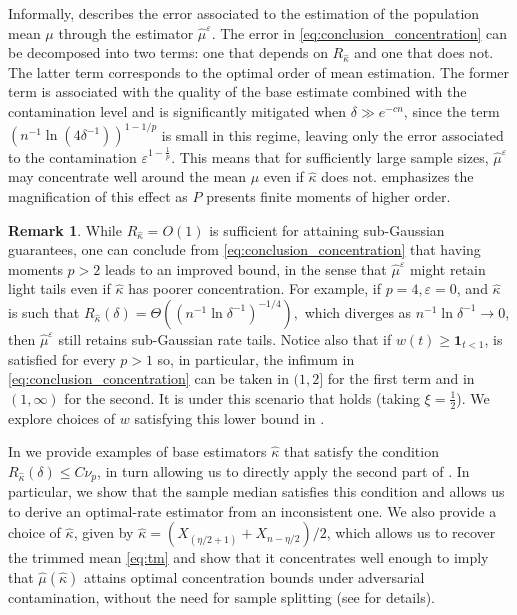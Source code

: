 \documentclass{article}
\theoremstyle{plain}
\theoremstyle{definition}
\newtheorem{remark}{Remark}
\begin{document}
Informally,  describes the error associated to the estimation of the population mean \( \mu \) through the estimator \( \widehat{\mu}^\varepsilon  \). The error in \eqref{eq:conclusion_concentration} can be decomposed into two terms: one that depends on $R_{\widehat{\kappa }} $ and one that does not. The latter term corresponds to the optimal order of mean estimation. The former term is associated with the quality of the base estimate combined with the contamination level and is significantly mitigated when \( \delta \gg e^{-cn}\), since the term \( \left(n^{-1}\ln (4\delta^{-1})\right)^{1-1/p}\) is small in this regime, leaving only the error associated to the contamination \( \varepsilon^{1-\frac{1}{p}} \). This means that for sufficiently large sample sizes, \( \widehat{\mu}^\varepsilon \) may concentrate well around the mean \( \mu \) even if \( \widehat{\kappa }   \) does not.  emphasizes the magnification of this effect as \( P \) presents finite moments of higher order.

\begin{remark}\label{remark:higher_moments} 
While \( R_{\widehat{\kappa } } = O(1) \) is sufficient for attaining sub-Gaussian guarantees, one can conclude from \eqref{eq:conclusion_concentration} that having moments $p>2$ leads to an improved bound, in the sense that $\widehat{\mu}^\varepsilon $ might retain light tails even if $\widehat{\kappa}$ has poorer concentration. For example, if \( p=4,\varepsilon=0 \), and \( \widehat{\kappa }  \) is such that $R_{\widehat{\kappa } }(\delta ) = \Theta((n^{-1}\ln \delta^{-1})^{-1/4}),$ which diverges as \( n^{-1} \ln \delta^{-1}  \to 0 \), then \( \widehat{\mu }^\varepsilon   \) still retains sub-Gaussian rate tails.
  Notice also that if $w(t) \geq \mathbf{1}_{t < 1}$,  is satisfied for every $p>1$ so, in particular, the infimum in \eqref{eq:conclusion_concentration} can be taken in \( (1,2] \) for the first term and in \( (1,\infty) \) for the second. It is under this scenario that  holds (taking \( \xi =\frac{1}{2} \)). We explore choices of $w$ satisfying this lower bound in .
\end{remark}

In  we provide examples of base estimators \( \widehat{\kappa }  \) that satisfy the condition \( R_{\widehat{\kappa } }(\delta ) \le C \nu _p \), in turn allowing us to directly apply the second part of . In particular, we show that the sample median satisfies this condition and allows us to derive an optimal-rate estimator from an inconsistent one. We also provide a choice of \( \widehat{\kappa }  \), given by \( \widehat{\kappa } = (X_{(\eta / 2 + 1)} + X_{ n - \eta /2}) / 2\), which allows us to recover the trimmed mean \eqref{eq:tm} and show that it concentrates well enough to imply that \( \widehat{\mu }(\widehat{\kappa})    \) attains optimal concentration bounds under adversarial contamination, without the need for sample splitting (see  for details).
\end{document}
